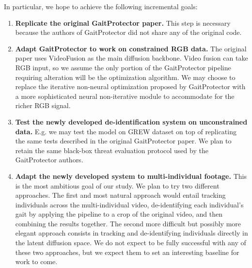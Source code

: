 In particular, we hope to achieve the following incremental goals:
\begin{enumerate}
    \item \textbf{Replicate the original GaitProtector paper.} This step is necessary because the authors of GaitProtector did not share any of the original code.
    \item \textbf{Adapt GaitProtector to work on constrained RGB data.} The original paper uses VideoFusion \cite{luo2023videofusion} as the main diffusion backbone. Video fusion can take
    RGB input, so we assume the only portion of the GaitProtector pipeline requiring alteration will be the optimization algorithm. We may choose to replace the iterative non-neural
    optimization proposed by GaitProtector with a more sophisticated neural non-iterative module to accommodate for the richer RGB signal.
    \item \textbf{Test the newly developed de-identification system on unconstrained data.} E.g. we may test the model on GREW dataset \cite{Zhu_2021_ICCV} on top of replicating
    the same tests described in the original GaitProtector paper. We plan to retain the same black-box threat evaluation protocol used by the GaitProtector authors.
    \item \textbf{Adapt the newly developed system to multi-individual footage.} This is the most ambitious goal of our study. We plan to try two different approaches. The first
    and most natural approach would entail tracking individuals across the multi-individual video, de-identifying each individual's gait by applying the pipeline to a crop of the original video, and then combining the results
    together. The second more difficult but possibly more elegant approach consists in tracking and de-identifying individuals directly in the latent diffusion space. We do not expect to
    be fully successful with any of these two approaches, but we expect them to set an interesting baseline for work to come.
\end{enumerate}